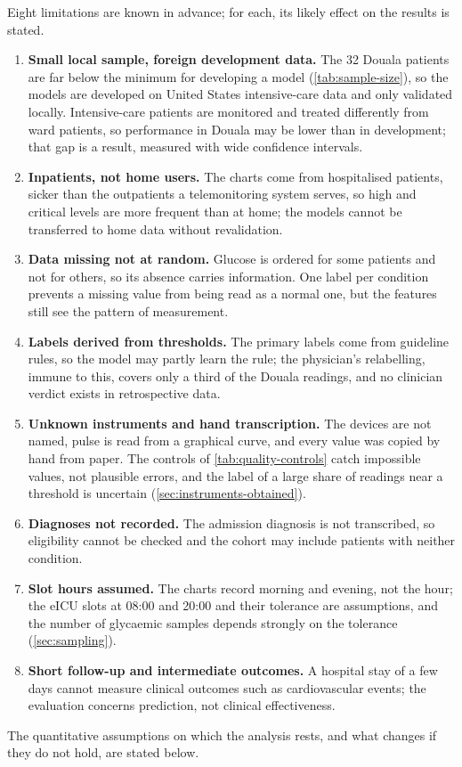Eight limitations are known in advance; for each, its likely effect on the results is stated.
\begin{enumerate}[nosep]
  \item \textbf{Small local sample, foreign development data.} The 32 Douala patients are far below the minimum for developing a model (\cref{tab:sample-size}), so the models are developed on United States intensive-care data and only validated locally. Intensive-care patients are monitored and treated differently from ward patients, so performance in Douala may be lower than in development; that gap is a result, measured with wide confidence intervals.
  \item \textbf{Inpatients, not home users.} The charts come from hospitalised patients, sicker than the outpatients a telemonitoring system serves, so high and critical levels are more frequent than at home; the models cannot be transferred to home data without revalidation.
  \item \textbf{Data missing not at random.} Glucose is ordered for some patients and not for others, so its absence carries information. One label per condition prevents a missing value from being read as a normal one, but the features still see the pattern of measurement.
  \item \textbf{Labels derived from thresholds.} The primary labels come from guideline rules, so the model may partly learn the rule; the physician's relabelling, immune to this, covers only a third of the Douala readings, and no clinician verdict exists in retrospective data.
  \item \textbf{Unknown instruments and hand transcription.} The devices are not named, pulse is read from a graphical curve, and every value was copied by hand from paper. The controls of \cref{tab:quality-controls} catch impossible values, not plausible errors, and the label of a large share of readings near a threshold is uncertain (\cref{sec:instruments-obtained}).
  \item \textbf{Diagnoses not recorded.} The admission diagnosis is not transcribed, so eligibility cannot be checked and the cohort may include patients with neither condition.
  \item \textbf{Slot hours assumed.} The charts record morning and evening, not the hour; the eICU slots at 08:00 and 20:00 and their tolerance are assumptions, and the number of glycaemic samples depends strongly on the tolerance (\cref{sec:sampling}).
  \item \textbf{Short follow-up and intermediate outcomes.} A hospital stay of a few days cannot measure clinical outcomes such as cardiovascular events; the evaluation concerns prediction, not clinical effectiveness.
\end{enumerate}
The quantitative assumptions on which the analysis rests, and what changes if they do not hold, are stated below.

